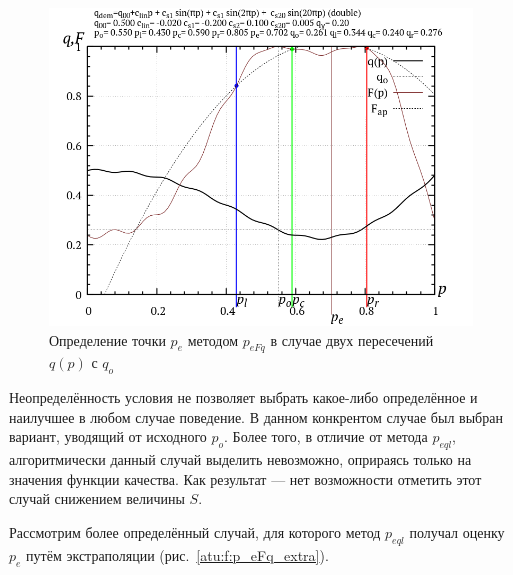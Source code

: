 \begin{figure}[htb!]
  \centerline{\includegraphics[width=60\TW]{p/p_eFq/q_p_eFq_double.png}}
  \caption{Определение точки $p_e$ методом $p_{eFq}$ в случае двух пересечений $q(p)$ с $q_o$ }
  \label{atu:f:p_eFq_double}
\end{figure}

Неопределённость условия не позволяет выбрать какое-либо определённое и
наилучшее в любом случае поведение. В данном конкрентом случае
был выбран вариант, уводящий от исходного $p_o$.
Более того, в отличие от метода $p_{eql}$,
алгоритмически данный случай выделить невозможно, оприраясь только на значения
функции качества. Как результат --- нет возможности отметить этот случай снижением
величины $S$.

Рассмотрим более определённый случай, для которого метод $p_{eql}$
получал оценку $p_e$ путём экстраполяции (рис.~\ref{atu:f:p_eFq_extra}).

